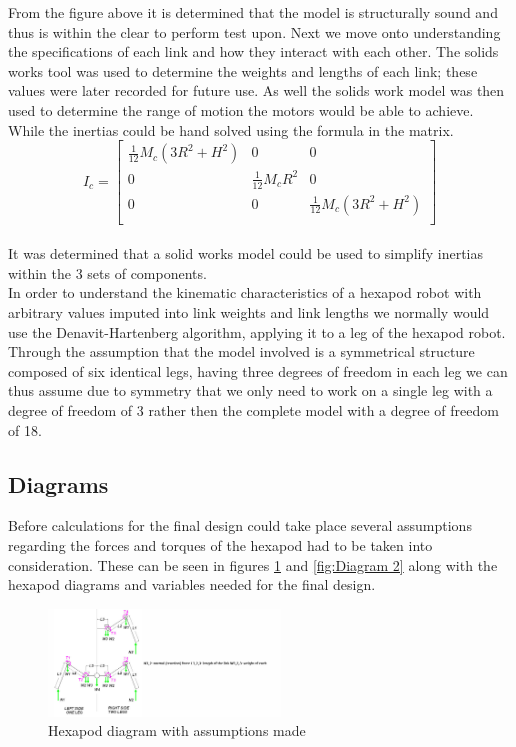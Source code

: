 From the figure above it is determined that the model is structurally sound and thus is within the clear to perform test upon. Next we move onto understanding the specifications of each link and how they interact with each other. The solids works tool was used to determine the weights and lengths of each link; these values were later recorded for future use. As well the solids work model was then used to determine the range of motion the motors would be able to achieve. While the inertias could be hand solved using the formula in the matrix.\\

\begin{equation*}
I_c = 
\begin{bmatrix}
\frac{1}{12} M_c (3R^2+H^2) & 0 & 0\\
0 & \frac{1}{12} M_c R^2 & 0\\
0 & 0 & \frac{1}{12} M_c (3R^2+H^2)\\

\end{bmatrix}
\end{equation*}\\

It was determined that a solid works model could be used to simplify inertias within the 3 sets of components.\\

In order to understand the kinematic characteristics of a hexapod robot with arbitrary values imputed into link weights and link lengths we normally would use the Denavit-Hartenberg algorithm, applying it to a leg of the hexapod robot. Through the assumption that the model involved is a symmetrical structure composed of six identical legs, having three degrees of freedom in each leg we can thus assume due to symmetry that we only need to work on a single leg with a degree of freedom of 3 rather then the complete model with a degree of freedom of 18.



\subsection{Diagrams}
Before calculations for the final design could take place several assumptions regarding the forces and torques of the hexapod had to be taken into consideration. These can be seen in figures \ref{fig: Diagram 1} and \ref{fig:Diagram 2} along with the hexapod diagrams and variables needed for  the final design.

\begin{figure}[h]

 \centering
   \includegraphics[width = 0.55\textwidth]{figures/1.png}            \caption{Hexapod diagram with assumptions made}
   \label{fig: Diagram 1}
\end{figure}

